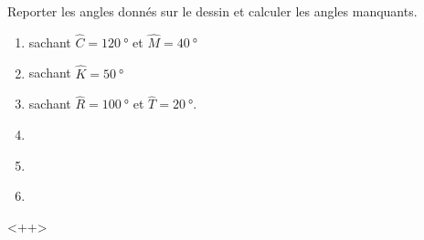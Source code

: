 
\begin{exercice}\label{exo2smath-0070}

    Reporter les angles donnés sur le dessin et calculer les angles manquants.
    \begin{enumerate}
        \item
   sachant
             \( \hat C=\SI{120}{\degree}\) et \( \hat{M}=\SI{40}{\degree}\)
\item
    sachant \( \hat{K}=\SI{50}{\degree}\)
\item
    sachant \( \hat{R}=\SI{100}{\degree}\) et \( \hat{T}=\SI{20}{\degree}\).
\item
\begin{center}
   
\end{center}
\item
\begin{center}
   
\end{center}
\item
\begin{center}
   
\end{center}
            
    \end{enumerate}
    <++>

\end{exercice}
